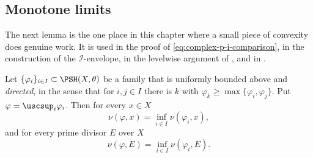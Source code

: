 \subsection{Monotone limits}
\label{sec:ch51-lelong-monotone}

The next lemma is the one place in this chapter where a small piece of
convexity does genuine work.  It is used in the proof of
\eqref{eq:complex-p-i-comparison}, in the construction of the
$\mathcal I$-envelope, in the levelwise argument of
, and in .

\par\noindent\begin{minipage}{\textwidth}
\begin{lemma}
\label{lem:ch51-lelong-increasing}
Let $\{\varphi_i\}_{i\in I}\subset\PSH(X,\theta)$ be a family that is
uniformly bounded above and \emph{directed}, in the sense that for
$i,j\in I$ there is $k$ with $\varphi_k\geq\max\{\varphi_i,
\varphi_j\}$.  Put $\varphi=\uscsup_i\varphi_i$.  Then for every
$x\in X$
\[
 \nu(\varphi,x)=\inf_{i\in I}\nu(\varphi_i,x),
\]
and for every prime divisor $E$ over $X$
\[
 \nu(\varphi,E)=\inf_{i\in I}\nu(\varphi_i,E).
\]
\end{lemma}
\end{minipage}\par\medskip

